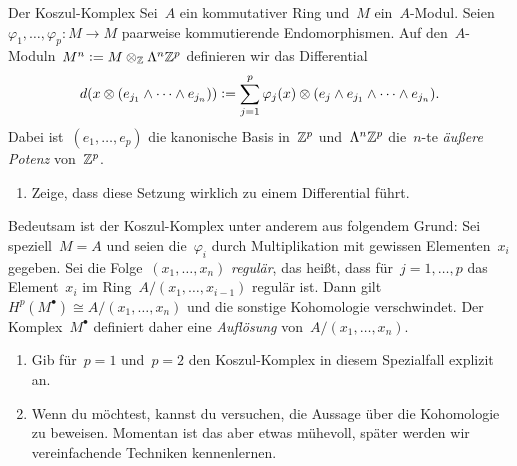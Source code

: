 \documentclass{uebblatt}
\begin{document}
\begin{aufgabe}{Der Koszul-Komplex}
Sei~$A$ ein kommutativer Ring und~$M$ ein~$A$-Modul.
Seien~$\varphi_1,\ldots,\varphi_p : M \to M$ paarweise kommutierende
Endomorphismen. Auf den~$A$-Moduln~$M^n \vcentcolon= M \otimes_{\mathbb{Z}} \Lambda^n \mathbb{Z}^p$
definieren wir das Differential
\[ d(x \otimes (e_{j_1} \wedge \cdots \wedge e_{j_n})) \vcentcolon=
  \sum_{j=1}^p \varphi_j(x) \otimes (e_j \wedge e_{j_1} \wedge \cdots \wedge
  e_{j_n}). \]
Dabei ist~$(e_1,\ldots,e_p)$ die kanonische Basis in~$\mathbb{Z}^p$ und~$\Lambda^n
\mathbb{Z}^p$ die~$n$-te \emph{äußere Potenz} von~$\mathbb{Z}^p$.
\begin{enumerate}
\item Zeige, dass diese Setzung wirklich zu einem Differential führt.
\end{enumerate}
Bedeutsam ist der Koszul-Komplex unter anderem aus folgendem Grund:
Sei speziell~$M = A$ und seien die~$\varphi_i$ durch Multiplikation mit
gewissen Elementen~$x_i$ gegeben. Sei die Folge~$(x_1,\ldots,x_n)$
\emph{regulär}, das heißt, dass für~$j = 1,\ldots,p$ das Element~$x_i$ im
Ring~$A/(x_1,\ldots,x_{i-1})$ regulär ist. Dann gilt~$H^p(M^\bullet) \cong
A/(x_1,\ldots,x_n)$ und die sonstige Kohomologie verschwindet. Der
Komplex~$M^\bullet$ definiert daher eine \emph{Auflösung}
von~$A/(x_1,\ldots,x_n)$.
\begin{enumerate}
\addtocounter{enumi}{1}
\item Gib für~$p = 1$ und~$p= 2$ den Koszul-Komplex in diesem Spezialfall
explizit an.
\item Wenn du möchtest, kannst du versuchen, die Aussage über die Kohomologie
zu beweisen. Momentan ist das aber etwas mühevoll, später werden wir
vereinfachende Techniken kennenlernen.
\end{enumerate}
\end{aufgabe}
\end{document}
